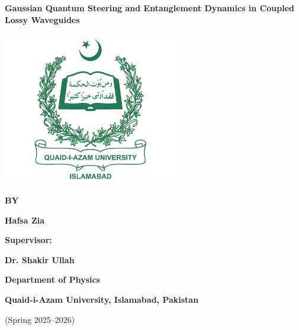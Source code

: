 \documentclass[12pt,a4paper]{report}
\begin{document}
\begin{titlepage}
	\centering

	{\LARGE \textbf{ Gaussian Quantum Steering and Entanglement Dynamics in Coupled Lossy Waveguides } \par}

	\vspace{1.5cm}

	\includegraphics[width=7.7cm]{QAU_enhanced_Logo} %

	\vspace{1cm}

	{\large \textbf{BY} \par}
	{\Large \textbf{Hafsa Zia} \par}
	\vspace{0.4cm}

	{\large \textbf{Supervisor:} \\}
	{\Large \textbf{Dr. Shakir Ullah} \par}

	\vspace{3cm}

	{\Large\textbf{Department of Physics} \par}
	{\textbf{Quaid-i-Azam University, Islamabad, Pakistan} \par}
	{(Spring 2025--2026) \par}

\end{titlepage}
\end{document}
